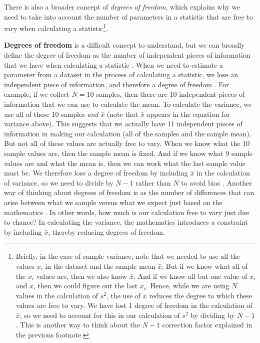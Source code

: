 \documentclass[
]{scrbook}
\begin{document}
There is also a broader concept of \emph{degrees of freedom}, which explains why we need to take into account the number of parameters in a statistic that are free to vary when calculating a statistic\footnote{Briefly, in the case of sample variance, note that we needed to use all the values \(x_{i}\) in the dataset and the sample mean \(\bar{x}\). But if we know what all of the \(x_{i}\) values are, then we also know \(\bar{x}\). And if we know all but one value of \(x_{i}\) and \(\bar{x}\), then we could figure out the last \(x_{i}\). Hence, while we are using \(N\) values in the calculation of \(s^{2}\), the use of \(\bar{x}\) reduces the degree to which these values are free to vary. We have lost 1 degree of freedom in the calculation of \(\bar{x}\), so we need to account for this in our calculation of \(s^{2}\) by dividing by \(N - 1\). This is another way to think about the \(N - 1\) correction factor \citep{Sokal1995} explained in the previous footnote.}.

\textbf{Degrees of freedom} is a difficult concept to understand, but we can broadly define the degree of freedom as the number of independent pieces of information that we have when calculating a statistic \citep{Grafen2002, Upton2014}.
When we need to estimate a parameter from a dataset in the process of calculating a statistic, we lose an independent piece of information, and therefore a degree of freedom \citep{Pandey2008}.
For example, if we collect \(N = 10\) samples, then there are 10 independent pieces of information that we can use to calculate the mean.
To calculate the variance, we use all of these 10 samples \emph{and} \(\bar{x}\) (note that \(\bar{x}\) appears in the equation for variance above).
This suggests that we actually have 11 independent pieces of information in making our calculation (all of the samples and the sample mean).
But not all of these values are actually free to vary.
When we know what the 10 sample values are, then the sample mean is fixed.
And if we know what 9 sample values are and what the mean is, then we can work what the last sample value must be.
We therefore lose a degree of freedom by including \(\bar{x}\) in the calculation of variance, so we need to divide by \(N - 1\) rather than \(N\) to avoid bias \citep{Wardlaw1985, Fowler1998}.
Another way of thinking about degrees of freedom is as the number of differences that can arise between what we sample versus what we expect just based on the mathematics \citep{Fryer1966}.
In other words, how much is our calculation free to vary just due to chance?
In calculating the variance, the mathematics introduces a constraint by including \(\bar{x}\), thereby reducing degrees of freedom.
\end{document}
